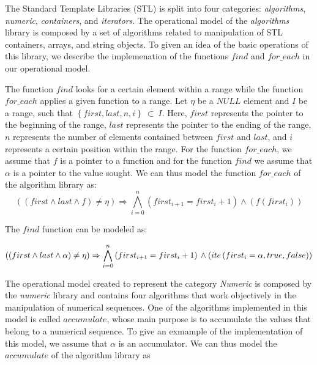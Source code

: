 \documentclass[a4paper]{llncs}
\begin{document}
The Standard Template Libraries (STL) is split into 
four categories: \textit{algorithms}, \textit{numeric}, 
\textit{containers}, and \textit{iterators}. The operational model 
of the \textit{algorithms} library is composed by a set of algorithms 
related to manipulation of STL containers, arrays, and string objects. 
To given an idea of the basic operations of this library, we describe 
the implemenation of the functions $find$ and $for\_each$ in our 
operational model. 

The function $find$ looks for a certain element within a range while the
function $for\_each$ applies a given function to a range. Let $\eta$ be 
a $NULL$ element and $I$ be a range, such that $\left\{first, last, n, i\right\}\:\subset\:I$. 
Here, $first$ represents the pointer to the beginning of the range, $last$ represents 
the pointer to the ending of the range, $n$ represents the number of elements 
contained between $first$ and $last$, and $i$ represents a certain position 
within the range. For the function $for\_each$, we assume that $f$ is a pointer 
to a function and for the function $find$ we assume that $\alpha$ is a pointer to the value sought.
We can thus model the function $for\_each$ of the algorithm library as:
%
\begin{equation}
\left(\left(first \wedge last \wedge f\right) \neq \eta\right) \Rightarrow
\bigwedge^{n}_{i=0} \left(first_{i+1} = first_{i} +1\right) \wedge \left(f\left(first_{i}\right)\right)
\label{eq:model-for-each}
\end{equation}

The $find$ function can be modeled as:

\begin{equation}\left(\left(first \wedge last \wedge \alpha\right) \neq \eta\right) \Rightarrow
\bigwedge^{n}_{i=0} \left(first_{i+1} = first_{i} +1\right)\\ \wedge \left(ite\left(first_{i} = \alpha, true,  false\right)\right)
\label{eq:model-find}
\end{equation}

The operational model created to represent the category \textit{Numeric} is 
composed by the \textit{numeric} library and contains four algorithms that work 
objectively in the manipulation of numerical sequences. One of the algorithms 
implemented in this model is called $accumulate$, whose main purpose is 
to accumulate the values that belong to a numerical sequence. To give an exmample 
of the implementation of this model, we assume that $\alpha$ is an accumulator.
We can thus model the $accumulate$ of the algorithm library as
\end{document}
